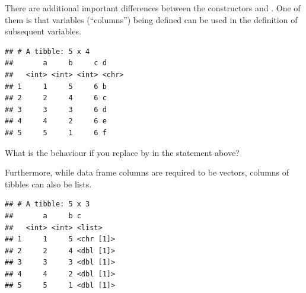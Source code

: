 \documentclass[krantz2]{krantz}\usepackage{knitr}%
\begin{document}
There are additional important differences between the constructors  and . One of them is that variables (``columns'')  being defined can be used in the definition of subsequent variables.

\begin{knitrout}\footnotesize
{}\color{fgcolor}\begin{kframe}
\begin{alltt}
\hlstd{(} \hlstd{=} \hlopt{:}\hlstd{,}  \hlstd{=} \hlopt{:}\hlstd{,}   \hlopt{+}   \hlstd{= letters[a} \hlopt{+} \hlstd{])}
\end{alltt}
\begin{verbatim}
## # A tibble: 5 x 4
##       a     b     c d    
##   <int> <int> <int> <chr>
## 1     1     5     6 b    
## 2     2     4     6 c    
## 3     3     3     6 d    
## 4     4     2     6 e    
## 5     5     1     6 f
\end{verbatim}
\end{kframe}
\end{knitrout}

\begin{playground}
What is the behaviour if you replace  by  in the statement above?
\end{playground}

Furthermore, while data frame columns are required to be vectors, columns of tibbles can also be lists.

\begin{knitrout}\footnotesize
{}\color{fgcolor}\begin{kframe}
\begin{alltt}
\hlstd{(} \hlstd{=} \hlopt{:}\hlstd{,}  \hlstd{=} \hlopt{:}\hlstd{,}  \hlstd{=} \hlstd{(}\hlstd{,} \hlstd{,} \hlstd{,} \hlstd{,} \hlstd{))}
\end{alltt}
\begin{verbatim}
## # A tibble: 5 x 3
##       a     b c        
##   <int> <int> <list>   
## 1     1     5 <chr [1]>
## 2     2     4 <dbl [1]>
## 3     3     3 <dbl [1]>
## 4     4     2 <dbl [1]>
## 5     5     1 <dbl [1]>
\end{verbatim}
\end{kframe}
\end{knitrout}
\end{document}
